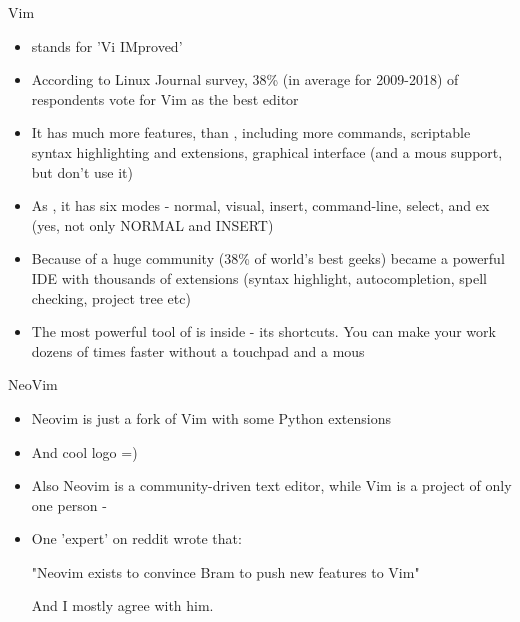 \documentclass[usenames,dvipsnames,10pt,aspectratio=169]{beamer}
\begin{document}
\begin{frame}{Vim}
    \begin{itemize}
        \item {} stands for 'Vi IMproved'
        \item According to Linux Journal survey, 38\% (in average for 2009-2018) of respondents vote for Vim as the best editor
        \item It has much more features, than , including more commands, scriptable syntax highlighting and extensions, graphical interface (and a mous support, but don't use it)
        \item As , it has six modes - normal, visual, insert, command-line, select, and ex (yes, not only NORMAL and INSERT)
        \item Because of a huge community (38\% of world's best geeks)  became a powerful IDE with thousands of extensions (syntax highlight, autocompletion, spell checking, project tree etc)
        \item The most powerful tool of  is inside - its shortcuts. You can make your work dozens of times faster without a touchpad and a mous
    \end{itemize}
\end{frame}

\begin{frame}{NeoVim}
    \begin{itemize}
        \item Neovim is just a fork of Vim with some Python extensions 
        \item And cool logo =)
        \item Also Neovim is a community-driven text editor, while Vim is a project of only one person - 
        \item One 'expert' on reddit wrote that:
        
                \hspace*{1cm} "Neovim exists to convince Bram to push new features to Vim"
            
            And I mostly agree with him.
    \end{itemize}    
\end{frame}
\end{document}
